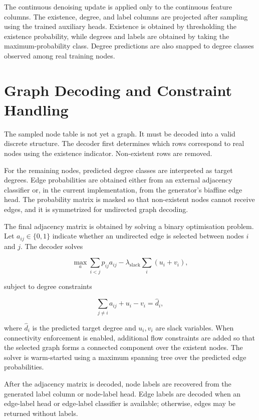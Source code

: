 The continuous denoising update is applied only to the continuous feature
columns. The existence, degree, and label columns are projected after sampling
using the trained auxiliary heads. Existence is obtained by thresholding the
existence probability, while degrees and labels are obtained by taking the
maximum-probability class. Degree predictions are also snapped to degree classes
observed among real training nodes.

\section{Graph Decoding and Constraint Handling}
\label{sec:generator:decoding}

The sampled node table is not yet a graph. It must be decoded into a valid
discrete structure. The decoder first determines which rows correspond to real
nodes using the existence indicator. Non-existent rows are removed.

For the remaining nodes, predicted degree classes are interpreted as target
degrees. Edge probabilities are obtained either from an external adjacency
classifier or, in the current implementation, from the generator's biaffine edge
head. The probability matrix is masked so that non-existent nodes cannot receive
edges, and it is symmetrized for undirected graph decoding.

The final adjacency matrix is obtained by solving a binary optimisation problem.
Let \(a_{ij}\in\{0,1\}\) indicate whether an undirected edge is selected between
nodes \(i\) and \(j\). The decoder solves

\[
\max_{a}
\sum_{i<j} p_{ij}a_{ij}
-
\lambda_{\mathrm{slack}}
\sum_i (u_i+v_i),
\]

subject to degree constraints

\[
\sum_{j\neq i} a_{ij} + u_i - v_i = \hat d_i,
\]

where \(\hat d_i\) is the predicted target degree and \(u_i,v_i\) are slack
variables. When connectivity enforcement is enabled, additional flow constraints
are added so that the selected graph forms a connected component over the
existent nodes. The solver is warm-started using a maximum spanning tree over the
predicted edge probabilities.

After the adjacency matrix is decoded, node labels are recovered from the
generated label column or node-label head. Edge labels are decoded when an
edge-label head or edge-label classifier is available; otherwise, edges may be
returned without labels.

